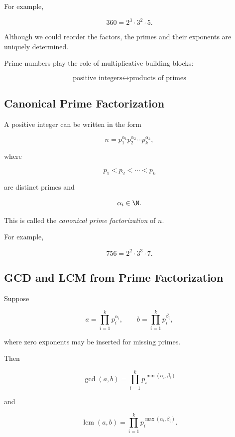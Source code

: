 For example,

\[ 360=2^3\cdot3^2\cdot5. \]

Although we could reorder the factors, the primes and their exponents are
uniquely determined.

\begin{conceptbox}
Prime numbers play the role of multiplicative building blocks:

\[
\boxed{
\text{positive integers}
\longleftrightarrow
\text{products of primes}
}
\]
\end{conceptbox}

\subsection{Canonical Prime Factorization}
\label{subsec:canonical-prime-factorization}

A positive integer can be written in the form

\[ n=p_1^{\alpha_1}p_2^{\alpha_2}\cdots p_k^{\alpha_k}, \]

where

\[ p_1<p_2<\cdots<p_k \]

are distinct primes and

\[ \alpha_i\in\N. \]

This is called the \emph{canonical prime factorization} of \(n\).

For example,

\[ 756=2^2\cdot3^3\cdot7. \]

\subsection{GCD and LCM from Prime Factorization}
\label{subsec:gcd-lcm-prime-factorization}

Suppose

\[ a=\prod_{i=1}^{k}p_i^{\alpha_i},\qquad b=\prod_{i=1}^{k}p_i^{\beta_i}, \]

where zero exponents may be inserted for missing primes.

Then

\[ \boxed{\gcd(a,b)=\prod_{i=1}^{k}p_i^{\min(\alpha_i,\beta_i)}} \]

and

\[ \boxed{\operatorname{lcm}(a,b)=\prod_{i=1}^{k}p_i^{\max(\alpha_i,\beta_i)}.} \]

